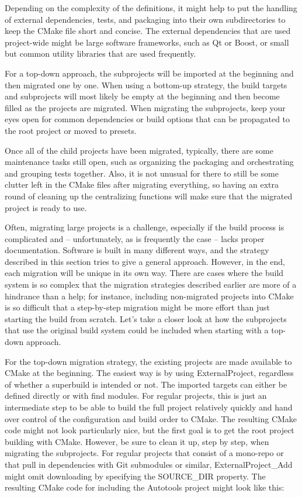 Depending on the complexity of the definitions, it might help to put the handling of external dependencies, tests, and packaging into their own subdirectories to keep the CMake file short and concise. The external dependencies that are used project-wide might be large software frameworks, such as Qt or Boost, or small but common utility libraries that are used frequently.

For a top-down approach, the subprojects will be imported at the beginning and then migrated one by one. When using a bottom-up strategy, the build targets and subprojects will most likely be empty at the beginning and then become filled as the projects are migrated. When migrating the subprojects, keep your eyes open for common dependencies or build options that can be propagated to the root project or moved to presets.

Once all of the child projects have been migrated, typically, there are some maintenance tasks still open, such as organizing the packaging and orchestrating and grouping tests together. Also, it is not unusual for there to still be some clutter left in the CMake files after migrating everything, so having an extra round of cleaning up the centralizing functions will make sure that the migrated project is ready to use.

Often, migrating large projects is a challenge, especially if the build process is complicated and – unfortunately, as is frequently the case – lacks proper documentation. Software is built in many different ways, and the strategy described in this section tries to give a general approach. However, in the end, each migration will be unique in its own way. There are cases where the build system is so complex that the migration strategies described earlier are more of a hindrance than a help; for instance, including non-migrated projects into CMake is so difficult that a step-by-step migration might be more effort than just starting the build from scratch. Let's take a closer look at how the subprojects that use the original build system could be included when starting with a top-down approach.


For the top-down migration strategy, the existing projects are made available to CMake at the beginning. The easiest way is by using ExternalProject, regardless of whether a superbuild is intended or not. The imported targets can either be defined directly or with find modules. For regular projects, this is just an intermediate step to be able to build the full project relatively quickly and hand over control of the configuration and build order to CMake. The resulting CMake code might not look particularly nice, but the first goal is to get the root project building with CMake. However, be sure to clean it up, step by step, when migrating the subprojects. For regular projects that consist of a mono-repo or that pull in dependencies with Git submodules or similar, ExternalProject\_Add might omit downloading by specifying the SOURCE\_DIR property. The resulting CMake code for including the Autotools project might look like this:

